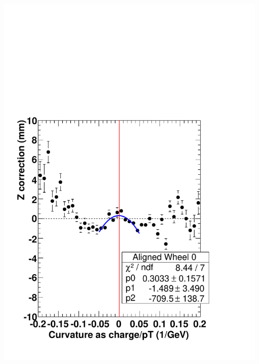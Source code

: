 \documentclass[compress]{beamer}
\begin{document}
\begin{frame}
\begin{columns}
\includegraphics[width=\linewidth]{ZvsCurvature_wh0_aligned.pdf}
\end{columns}
\end{frame}
\end{document}

